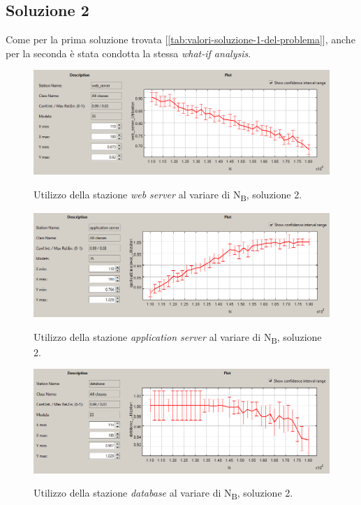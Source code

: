 \documentclass[../main.tex]{subfiles}
\begin{document}
    \subsection{Soluzione 2}\label{subsec:soluzione-2}
    Come per la prima soluzione trovata [\ref{tab:valori-soluzione-1-del-problema}], anche per la seconda è stata condotta
    la stessa \textit{what-if analysis}.

    \begin{figure}[H]
        \centering
        \includegraphics[scale = 0.6]{assets/ws_ut_2.PNG}\\
        \caption[\textit{Utilizzo} della stazione \textit{web server}, soluzione 2]{Utilizzo della stazione
        \textit{web server} al variare di N\textsubscript{B}, soluzione 2.}
        \label{fig:utilizzo-2-ws}
    \end{figure}

    \begin{figure}[H]
        \centering
        \includegraphics[scale = 0.6]{assets/as_ut_2.PNG}\\
        \caption[\textit{Utilizzo} della stazione \textit{application server}, soluzione 2]{Utilizzo della stazione
        \textit{application server} al variare di N\textsubscript{B}, soluzione 2.}
        \label{fig:utilizzo-2-as}
    \end{figure}

    \begin{figure}[H]
        \centering
        \includegraphics[scale = 0.6]{assets/db_ut_2.PNG}\\
        \caption[\textit{Utilizzo} della stazione \textit{database}, soluzione 2]{Utilizzo della stazione
        \textit{database} al variare di N\textsubscript{B}, soluzione 2.}
        \label{fig:utilizzo-2-db}
    \end{figure}
\end{document}

